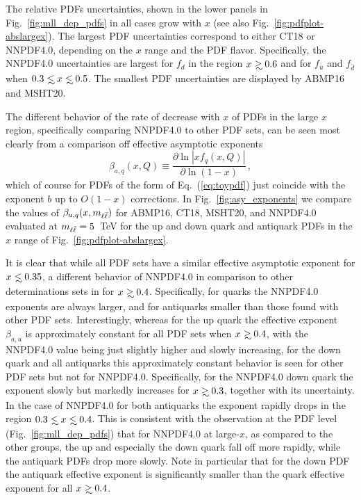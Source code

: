 The relative PDFs uncertainties, shown
in the lower panels in
Fig.~\ref{fig:mll_dep_pdfs}  in all cases
grow with $x$ (see also  Fig.~\ref{fig:pdfplot-abslargex}).
%
The largest PDF uncertainties correspond to either CT18 or NNPDF4.0, 
depending on the $x$ range and the PDF flavor.
%
Specifically, the NNPDF4.0 uncertainties are largest for $f_d$ in the
region $x\gsim 0.6$ 
and for $f_{\bar{u}}$ and $f_{\bar{d}}$ when $0.3 \lsim x \lsim 0.5$.
%
The smallest PDF uncertainties are displayed by ABMP16 and  MSHT20.

The different behavior of the rate of decrease with $x$ of
PDFs  in the large $x$ region, specifically comparing NNPDF4.0
to other PDF sets, can  be seen most clearly from a comparison off
effective asymptotic exponents~\cite{Ball:2016spl}
\begin{equation}
  \beta_{a,q}(x,Q)\equiv\frac{\partial \ln|xf_q(x,Q)|}{\partial \ln(1-x)}\,,
  \label{eq:beta_asy}
\end{equation}
which of course for PDFs of the form of Eq.~(\ref{eq:toypdf}) just
coincide with the exponent $b$ up to $O(1-x)$ corrections.
In Fig.~\ref{fig:asy_exponents} we compare
the values of $\beta_{a,q}(x,m_{\ell\bar{\ell}})$
for ABMP16, CT18, MSHT20, and NNPDF4.0 evaluated at $m_{\ell\bar{\ell}}=5$~TeV
for the up and down quark and antiquark PDFs in the  $x$ range of
Fig.~\ref{fig:pdfplot-abslargex}.

It is clear that while all PDF
sets have a similar effective asymptotic exponent for $x\lsim 0.35$, a
different behavior of NNPDF4.0 in comparison to other
determinations sets in for $x\gsim 0.4$.
%
Specifically, for quarks the NNPDF4.0 exponents are always larger,
and for antiquarks smaller than those found with other PDF
sets.
%
Interestingly, whereas for the up quark the
effective exponent $\beta_{a,u}$ is approximately constant for all
PDF sets when  $x\gsim 0.4$, with the NNPDF4.0 value being just
slightly higher and slowly increasing, for the down quark and all
antiquarks this approximately constant behavior is seen for other
PDF sets but not for NNPDF4.0.
%
Specifically, for the NNPDF4.0 down quark
the exponent slowly but markedly increases for $x\gsim 0.3$, together 
with its uncertainty.
%
In the case of NNPDF4.0 for both antiquarks the exponent
rapidly drops  in the region $0.3 \lsim x \lsim 0.4$.
%
This is consistent with the observation at the PDF level
(Fig.~\ref{fig:mll_dep_pdfs})  that for NNPDF4.0
at large-$x$, as compared to the other groups,
the up and especially the down  quark fall off more rapidly, while
the antiquark PDFs drop more slowly. Note in particular that for
the down PDF the antiquark effective exponent is significantly
smaller than the quark effective exponent for all $x\gsim0.4$.

